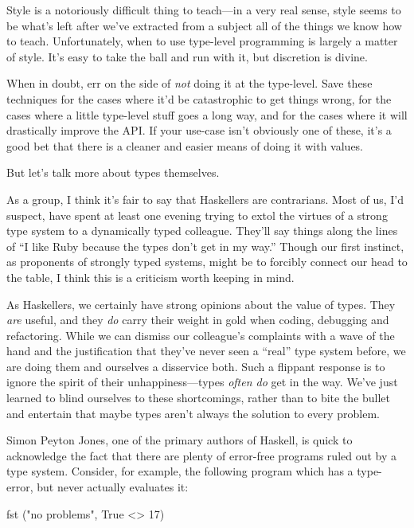 \documentclass[book.tex]{subfiles}
\begin{document}
Style is a notoriously difficult thing to teach---in a very real sense, style
seems to be what's left after we've extracted from a subject all of the things
we know how to teach. Unfortunately, when to use type-level programming is
largely a matter of style. It's easy to take the ball and run with it, but
discretion is divine.

When in doubt, err on the side of \emph{not} doing it at the type-level. Save
these techniques for the cases where it'd be catastrophic to get things wrong,
for the cases where a little type-level stuff goes a long way, and for the cases
where it will drastically improve the API. If your use-case isn't obviously one
of these, it's a good bet that there is a cleaner and easier means of doing it
with values.

But let's talk more about types themselves.

As a group, I think it's fair to say that Haskellers are contrarians. Most of
us, I'd suspect, have spent at least one evening trying to extol the virtues of
a strong type system to a dynamically typed colleague. They'll say things along
the lines of ``I like Ruby because the types don't get in my way.'' Though our
first instinct, as proponents of strongly typed systems, might be to forcibly
connect our head to the table, I think this is a criticism worth keeping in
mind.

As Haskellers, we certainly have strong opinions about the value of types. They
\emph{are} useful, and they \emph{do} carry their weight in gold when coding,
debugging and refactoring. While we can dismiss our colleague's complaints with
a wave of the hand and the justification that they've never seen a ``real'' type
system before, we are doing them and ourselves a disservice both. Such a
flippant response is to ignore the spirit of their unhappiness---types
\emph{often do} get in the way.  We've just learned to blind ourselves to these
shortcomings, rather than to bite the bullet and entertain that maybe types
aren't always the solution to every problem.

Simon Peyton Jones, one of the primary authors of Haskell, is quick to
acknowledge the fact that there are plenty of error-free programs ruled out by a
type system. Consider, for example, the following program which has a
type-error, but never actually evaluates it:

\begin{code}
fst ("no problems", True <> 17)
\end{code}
\end{document}
